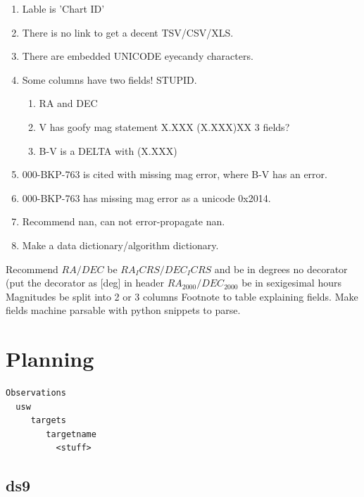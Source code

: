 \documentclass[letter,11pt,oneside]{article}
\begin{document}
\vspace{-.15cm}
\begin{enumerate}\addtolength{\itemsep}{-0.5\baselineskip}
   \item   Lable is 'Chart ID'
   \item   There is no link to get a decent TSV/CSV/XLS.
   \item   There are embedded UNICODE eyecandy characters.
   \item   Some columns have two fields! STUPID.
\vspace{-.15cm}
\begin{enumerate}\addtolength{\itemsep}{-0.5\baselineskip}
   \item     RA and DEC
   \item     V has goofy mag statement X.XXX (X.XXX)XX 3 fields?
   \item     B-V is a DELTA with (X.XXX)
\end{enumerate}

   \item   000-BKP-763 is cited with missing mag error, where B-V    has an error. 
   \item   000-BKP-763 has missing mag error as a unicode 0x2014.
   \item      Recommend nan, can not error-propagate nan.
   \item   Make a data dictionary/algorithm dictionary. 
\end{enumerate}



Recommend
$RA/DEC$ be $RA_ICRS/DEC_ICRS$ and be in degrees no decorator
   (put the decorator as [deg] in header
$RA_2000/DEC_2000$ be in sexigesimal hours
Magnitudes be split into 2 or 3 columns
Footnote to table explaining fields.
Make fields machine parsable with python snippets to parse.

\section{Planning}

\begingroup \fontsize{10pt}{10pt}
\selectfont
\begin{verbatim} 
Observations
  usw
     targets
        targetname
          <stuff>
\end{verbatim}
\endgroup

\subsection{ds9}
\end{document}
